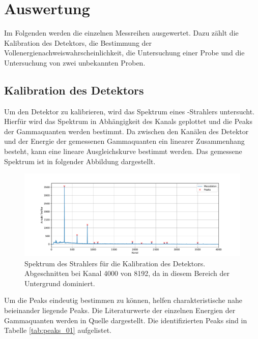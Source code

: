 \section{Auswertung}
\label{sec:Auswertung}
Im Folgenden werden die einzelnen Messreihen ausgewertet. Dazu zählt die Kalibration des Detektors, die Bestimmung der Vollenergienachweiswahrscheinlichkeit,
die Untersuchung einer  Probe und die Untersuchung von zwei unbekannten Proben.
\subsection{Kalibration des Detektors}
Um den Detektor zu kalibrieren, wird das Spektrum eines -Strahlers untersucht. Hierfür wird das Spektrum in Abhängigkeit des 
Kanals geplottet und die Peaks der Gammaquanten werden bestimmt. Da zwischen den Kanälen des Detektor und der Energie 
der gemessenen Gammaquanten ein linearer Zusammenhang besteht, kann eine lineare Ausgleichskurve bestimmt werden.
Das gemessene Spektrum ist in folgender Abbildung dargestellt.
\FloatBarrier
\begin{figure}
  \centering
  \includegraphics[width = \textwidth,keepaspectratio]{figure/Peaks_01.pdf}
  \caption{Spektrum des  Strahlers für die Kalibration des Detektors. Abgeschnitten bei Kanal 4000 von 8192, da 
  in diesem Bereich der Untergrund dominiert.}
  \label{fig:Peaks_01}
\end{figure}
\FloatBarrier
Um die Peaks eindeutig bestimmen zu können, helfen charakteristische nahe beieinander liegende Peaks.
Die Literaturwerte der einzelnen Energien der Gammaquanten werden in Quelle \cite{Gamma_lit} dargestellt.
Die identifizierten Peaks sind in Tabelle \ref{tab:peaks_01} aufgelistet.
\FloatBarrier
